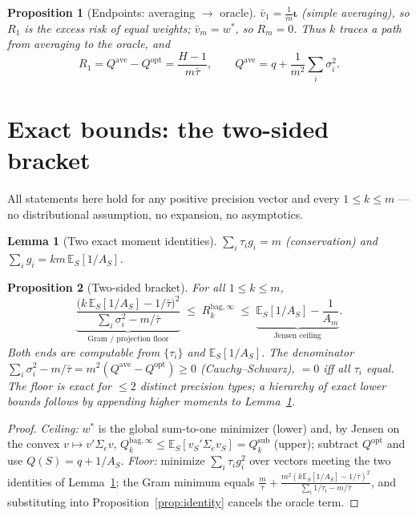 \documentclass[11pt]{article}
\newcommand{\Sig}{\Sigma_e}
\newcommand{\E}{\mathbb{E}}
\newcommand{\Rk}{R_k^{\mathrm{bag},\infty}}
\newcommand{\Qsub}{Q_k^{\mathrm{sub}}}
\newcommand{\Qopt}{Q^{\mathrm{opt}}}
\newcommand{\Qave}{Q^{\mathrm{ave}}}
\newcommand{\iotab}{\bm{\iota}}
\newtheorem{lemma}{Lemma}
\newtheorem{proposition}{Proposition}
\begin{document}
\begin{proposition}[Endpoints: averaging $\to$ oracle]\label{prop:endpoints}
$\bar v_1=\tfrac1m\iotab$ (simple averaging), so $R_1$ is the excess risk of equal weights;
$\bar v_m=w^\ast$, so $R_m=0$. Thus $k$ traces a path from averaging to the oracle, and
\[
  R_1=\Qave-\Qopt=\frac{H-1}{m\bar\tau},\qquad \Qave=q+\frac{1}{m^2}\sum_i\sigma_i^2 .
\]
\end{proposition}

\section{Exact bounds: the two-sided bracket}\label{sec:bracket}
All statements here hold for any positive precision vector and every $1\le k\le m$ --- no
distributional assumption, no expansion, no asymptotics.

\begin{lemma}[Two exact moment identities]\label{lem:moments}
$\sum_i\tau_ig_i=m$ (conservation) and $\sum_ig_i=km\,\E_S[1/A_S]$.
\end{lemma}

\begin{proposition}[Two-sided bracket]\label{prop:bracket}
For all $1\le k\le m$,
\[
  \underbrace{\frac{\big(k\,\E_S[1/A_S]-1/\bar\tau\big)^2}{\sum_i\sigma_i^2-m/\bar\tau}}
  _{\text{Gram / projection floor}}
  \;\le\;\Rk\;\le\;
  \underbrace{\E_S[1/A_S]-\frac1{A_m}}_{\text{Jensen ceiling}} .
\]
Both ends are computable from $\{\tau_i\}$ and $\E_S[1/A_S]$. The denominator
$\sum_i\sigma_i^2-m/\bar\tau=m^2(\Qave-\Qopt)\ge0$ (Cauchy--Schwarz), $=0$ iff all $\tau_i$
equal. The floor is \emph{exact} for $\le2$ distinct precision types; a hierarchy of exact
lower bounds follows by appending higher moments to Lemma~\ref{lem:moments}.
\end{proposition}
\begin{proof}
\emph{Ceiling:} $w^\ast$ is the global sum-to-one minimizer (lower) and, by Jensen on the
convex $v\mapsto v'\Sig v$, $Q_k^{\mathrm{bag},\infty}\le\E_S[v_S'\Sig v_S]=\Qsub$ (upper);
subtract $\Qopt$ and use $Q(S)=q+1/A_S$. \emph{Floor:} minimize $\sum_i\tau_ig_i^2$ over
vectors meeting the two identities of Lemma~\ref{lem:moments}; the Gram minimum equals
$\frac{m}{\bar\tau}+\frac{m^2(k\E_S[1/A_S]-1/\bar\tau)^2}{\sum_i1/\tau_i-m/\bar\tau}$, and
substituting into Proposition~\ref{prop:identity} cancels the oracle term.
\end{proof}
\end{document}

